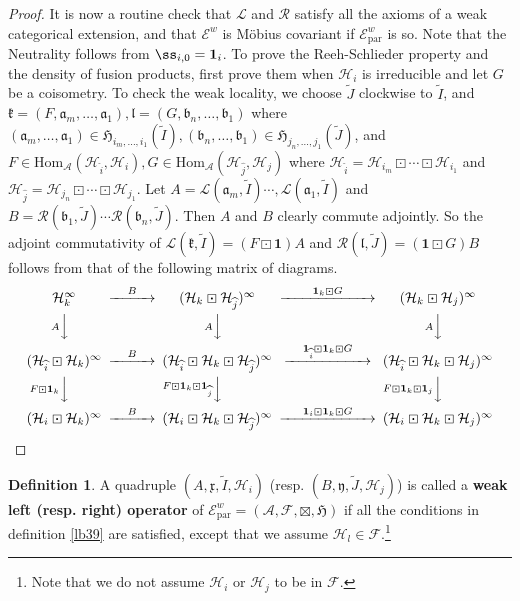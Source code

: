 \documentclass[11pt,b5paper,notitlepage]{article}
\theoremstyle{definition}
\newtheorem{df}{Definition}[subsection]
\theoremstyle{plain}
\newcommand{\fk}{\mathfrak}
\newcommand{\mc}{\mathcal}
\newcommand{\wtd}{\widetilde}
\newcommand{\wht}{\widehat}
\newcommand{\id}{\mathbf{1}}
\newcommand{\Hom}{\mathrm{Hom}}
\newcommand{\loc}{\mathrm{par}}
\newcommand{\scr}{\mathscr}
\numberwithin{equation}{subsection}
\begin{document}
\begin{proof}
It is now a routine check that $\mc L$ and $\mc R$ satisfy all the axioms of a weak categorical extension, and that $\scr E^w$ is M\"obius covariant if $\scr E^w_\loc$ is so. Note that the Neutrality follows from $\ss_{i,0}=\id_i$. To prove the Reeh-Schlieder property and the density of fusion products, first prove them when $\mc H_i$ is irreducible and let $G$ be a coisometry.  To check the weak locality, we choose $\wtd J$ clockwise to $\wtd I$, and $\fk k=(F,\fk a_m,\dots,\fk a_1),\fk l=(G,\fk b_n,\dots,\fk b_1)$ where $(\fk a_m,\dots,\fk a_1)\in \fk H_{i_m,\dots,i_1}(\wtd I),(\fk b_n,\dots,\fk b_1)\in \fk H_{j_n,\dots,j_1}(\wtd J)$, and $F\in\Hom_{\mc A}(\mc H_{\wht i},\mc H_i),G\in\Hom_{\mc A}(\mc H_{\wht j},\mc H_j)$ where $\mc H_{\wht i}=\mc H_{i_m}\boxdot\cdots\boxdot\mc H_{i_1}$ and $\mc H_{\wht j}=\mc H_{j_n}\boxdot\cdots\boxdot\mc H_{j_1}$. Let $A=\mc L(\fk a_m,\wtd I)\cdots,\mc L(\fk a_1,\wtd I)$ and $B=\mc R(\fk b_1,\wtd J)\cdots\mc R(\fk b_n,\wtd J)$. Then $A$ and $B$ clearly commute adjointly. So the adjoint commutativity of $\mc L(\fk k,\wtd I)=(F\boxdot\id)A$ and $\mc R(\fk l,\wtd J)=(\id\boxdot G)B$ follows from that of the following matrix of diagrams.
\begin{align*}
\begin{CD}
\mc H_k^\infty @>\quad B \quad >> (\mc H_k\boxdot\mc H_{\wht j})^\infty @> ~~~~~~  \id_k\boxdot G ~~~~~~  >> (\mc H_k\boxdot\mc H_j)^\infty\\
@V A  VV @V A VV @V A VV\\
(\mc H_{\wht i}\boxdot\mc H_k)^\infty @> \quad  B \quad  >> (\mc H_{\wht i}\boxdot\mc H_k\boxdot\mc H_{\wht j})^\infty   @> \quad \id_{\wht i}\boxdot\id_k\boxdot G\quad  >>(\mc H_{\wht i}\boxdot\mc H_k\boxdot\mc H_j)^\infty\\
@V F\boxdot\id_k  VV @V  F\boxdot\id_k\boxdot\id_{\wht j} VV @V  F\boxdot\id_k\boxdot\id_j  VV\\
(\mc H_i\boxdot\mc H_k)^\infty @> \quad B \quad  >>(\mc H_i\boxdot\mc H_k\boxdot\mc H_{\wht j})^\infty  @>~~~~  \id_i\boxdot\id_k\boxdot G~~~~  >>(\mc H_i\boxdot\mc H_k\boxdot\mc H_j)^\infty
\end{CD}
\end{align*} 
\end{proof}


\begin{df}
A quadruple $(A,\fk x,\wtd I,\mc H_i)$ (resp. $(B,\fk y,\wtd J,\mc H_j)$) is called a \textbf{weak left (resp. right) operator} of $\scr E^w_\loc=(\mc A,\mc F,\boxtimes,\fk H)$ if all the conditions in definition \ref{lb39} are satisfied, except that we assume $\mc H_l\in\mc F$.\footnote{Note that we do not assume $\mc H_i$ or $\mc H_j$ to be in $\mc F$.}
\end{df}
\end{document}
